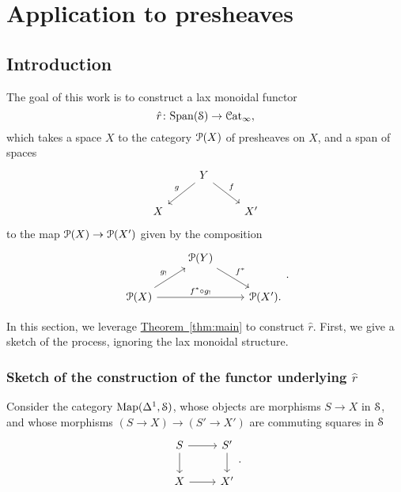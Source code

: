 \documentclass[main.tex]{subfiles}
\begin{document}
\section{Application to presheaves}
\label{sec:application_to_presheaves}

\subsection{Introduction}
\label{ssc:introduction}

The goal of this work is to construct a lax monoidal functor
\begin{equation}
  \label{eq:rhat}
  \hat{r}\colon \Span(\S) \to \ICat,
\end{equation}
which takes a space $X$ to the category $\P(X)$ of presheaves on $X$, and a span of spaces
\begin{equation*}
  \begin{tikzcd}
    & Y
    \arrow[dl, swap, "g"]
    \arrow[dr, "f"]
    \\
    X
    && X'
  \end{tikzcd}
\end{equation*}
to the map $\P(X) \to \P(X')$ given by the composition
\begin{equation*}
  \begin{tikzcd}
    & \P(Y)
    \arrow[dr, "f^{*}"]
    \\
    \P(X)
    \arrow[ur, "g_{!}"]
    \arrow[rr, "f^{*} \circ g_{!}"]
    && \P(X').
  \end{tikzcd}.
\end{equation*}

In this section, we leverage \hyperref[thm:main]{Theorem~\ref*{thm:main}} to construct $\hat{r}$. First, we give a sketch of the process, ignoring the lax monoidal structure.

\subsubsection{Sketch of the construction of the functor underlying \texorpdfstring{$\hat{r}$}{r}}
\label{sss:sketch_of_underlying_functor}

Consider the category $\Map(\Delta^{1}, \S)$, whose objects are morphisms $S \to X$ in $\S$, and whose morphisms $(S \to X) \to (S' \to X')$ are commuting squares in $\S$
\begin{equation*}
  \begin{tikzcd}
    S
    \arrow[r]
    \arrow[d]
    & S'
    \arrow[d]
    \\
    X
    \arrow[r]
    & X'
  \end{tikzcd}.
\end{equation*}
\end{document}
